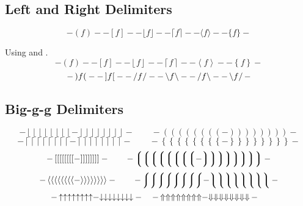 \subsection{Left and Right Delimiters \showfamily}

\def\testdelim#1#2{ - #1 f #2 - }
\begin{displaymath}
  \testdelim() 
  \testdelim[] 
  \testdelim\lfloor\rfloor 
  \testdelim\lceil\rceil 
  \testdelim\langle\rangle 
  \testdelim\{\} 
\end{displaymath}

Using {\tt\string\left} and {\tt\string\right}.
\def\testdelim#1#2{ - \left#1 f \right#2 - }
\begin{displaymath}
  \testdelim() 
  \testdelim[] 
  \testdelim\lfloor\rfloor 
  \testdelim\lceil\rceil 
  \testdelim\langle\rangle 
  \testdelim\{\} 
\end{displaymath}
\begin{displaymath}
  \testdelim)(
  \testdelim][
  \testdelim// 
  \testdelim\backslash\backslash
  \testdelim/\backslash 
  \testdelim\backslash/
\end{displaymath}


\subsection{Big-g-g Delimiters \showfamily}

\def\testdelim#1#2{%
  - \left#1\left#1\left#1\left#1\left#1\left#1\left#1\left#1 - 
  \right#2\right#2\right#2\right#2\right#2\right#2\right#2\right#2 -}

\begingroup
\delimitershortfall-1pt
\begin{displaymath}
  \testdelim\lfloor\rfloor 
  \qquad 
  \testdelim()
\end{displaymath}
\begin{displaymath}
  \testdelim\lceil\rceil 
  \qquad 
  \testdelim\{\} 
\end{displaymath}
\begin{displaymath}
  \testdelim[] 
  \qquad 
  \testdelim\lgroup\rgroup
\end{displaymath}
\begin{displaymath}
  \testdelim\langle\rangle
  \qquad 
  \testdelim\lmoustache\rmoustache
\end{displaymath}
\begin{displaymath}
  \testdelim\uparrow\downarrow \quad
  \testdelim\Uparrow\Downarrow \quad
\end{displaymath}
\endgroup %

